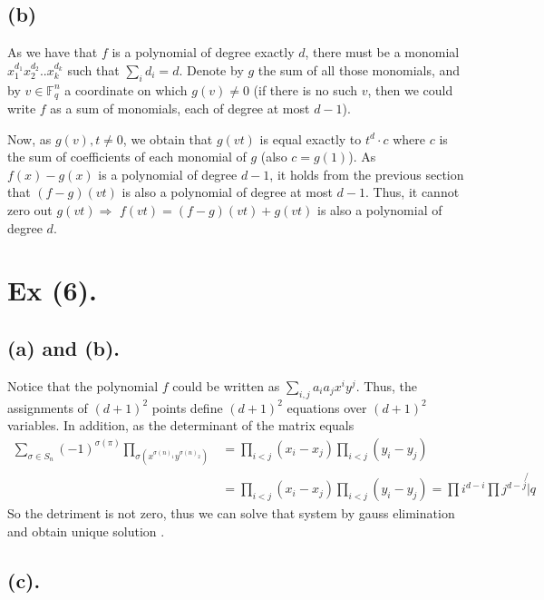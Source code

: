 \documentclass{article}
\newcommand{\FF}{\mathbb{F}}
\begin{document}
\subsection{(b)} As we have that $f$ is a polynomial of degree exactly $d$, there must be a monomial $x_{1}^{d_{1}}x_{2}^{d_{2}}..x_{k}^{d_{k}}$ such that $\sum_{i}{d_{i}} = d$. Denote by $g$ the sum of all those monomials, and by $v \in \FF_{q}^{n}$ a coordinate on which $g(v) \neq 0$ (if there is no such $v$, then we could write $f$ as a sum of monomials, each of degree at most $d-1$).

Now, as $g(v),t \neq 0$, we obtain that $g(vt)$ is equal exactly to $t^{d}\cdot c$ where $c$ is the sum of coefficients of each monomial of $g$ (also $c = g(1)$). As $f(x) - g(x)$ is a polynomial of degree $d-1$, it holds from the previous section that $(f-g)(vt)$ is also a polynomial of degree at most $d-1$. Thus, it cannot zero out $g(vt) \Rightarrow$ $f(vt) = (f - g)(vt) + g(vt)$ is also a polynomial of degree $d$.        

\section{Ex (6).}
\subsection{(a) and (b).} Notice that the polynomial $f$ could be written as $\sum_{i,j}{a_{i}a_{j}x^{i}y^{j}}$. Thus, the assignments of $(d+1)^{2}$ points define $(d+1)^{2}$ equations over $(d+1)^{2}$ variables. In addition, as the determinant of the matrix equals
\begin{equation}
  \begin{split}
  \sum_{\sigma \in S_{n}}{ \left( -1 \right)^{\sigma(\pi)}\prod_{\sigma( x^{\sigma(n)_{1}}y^{\sigma(n)_{2}}  ) } } &= \prod_{i<j}{\left(x_{i} - x_{j}  \right)}\prod_{i<j}\left(y_{i} -y_{j} \right) \\
  &= \prod_{i<j}{\left(x_{i} - x_{j}  \right)}\prod_{i<j}\left(y_{i} -y_{j} \right) = \prod{i^{d-i}}\prod{j^{d-j}} \not{|} q
\end{split}
\end{equation}
So the detriment is not zero, thus we can solve that system by gauss elimination and obtain unique solution . 


\subsection{(c).}

  \printbibliography 
\end{document}
